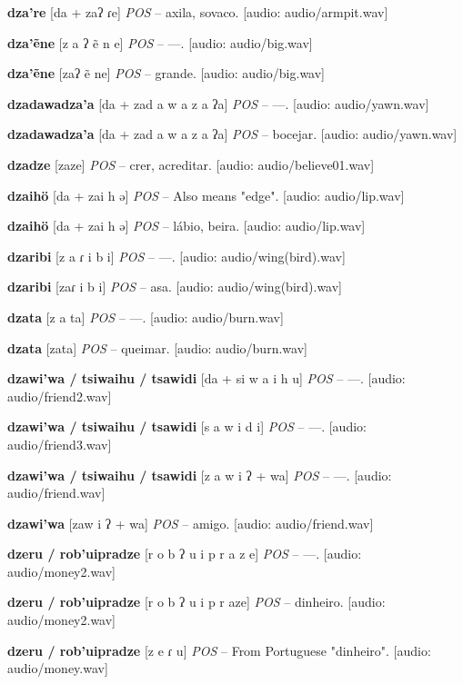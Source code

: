 \textbf{dza're} [da + zaʔ ɾe] \textit{POS} -- axila, sovaco. [audio: audio/armpit.wav]{\faHeadphones}

\textbf{dza'ẽne} [z a ʔ ẽ n e] \textit{POS} -- —. [audio: audio/big.wav]{\faHeadphones}

\textbf{dza'ẽne} [zaʔ ẽ ne] \textit{POS} -- grande. [audio: audio/big.wav]{\faHeadphones}

\textbf{dzadawadza'a} [da + zad a w a z a ʔa] \textit{POS} -- —. [audio: audio/yawn.wav]{\faHeadphones}

\textbf{dzadawadza'a} [da + zad a w a z a ʔa] \textit{POS} -- bocejar. [audio: audio/yawn.wav]{\faHeadphones}

\textbf{dzadze} [zaze] \textit{POS} -- crer, acreditar. [audio: audio/believe01.wav]{\faHeadphones}

\textbf{dzaihö} [da + zai h ə] \textit{POS} -- Also means "edge". [audio: audio/lip.wav]{\faHeadphones}

\textbf{dzaihö} [da + zai h ə] \textit{POS} -- lábio, beira. [audio: audio/lip.wav]{\faHeadphones}

\textbf{dzaribi} [z a ɾ i b i] \textit{POS} -- —. [audio: audio/wing(bird).wav]{\faHeadphones}

\textbf{dzaribi} [zaɾ i b i] \textit{POS} -- asa. [audio: audio/wing(bird).wav]{\faHeadphones}

\textbf{dzata} [z a ta] \textit{POS} -- —. [audio: audio/burn.wav]{\faHeadphones}

\textbf{dzata} [zata] \textit{POS} -- queimar. [audio: audio/burn.wav]{\faHeadphones}

\textbf{dzawi'wa / tsiwaihu / tsawidi} [da + si w a i h u] \textit{POS} -- —. [audio: audio/friend2.wav]{\faHeadphones}

\textbf{dzawi'wa / tsiwaihu / tsawidi} [s a w i d i] \textit{POS} -- —. [audio: audio/friend3.wav]{\faHeadphones}

\textbf{dzawi'wa / tsiwaihu / tsawidi} [z a w i ʔ + wa] \textit{POS} -- —. [audio: audio/friend.wav]{\faHeadphones}

\textbf{dzawi'wa} [zaw i ʔ + wa] \textit{POS} -- amigo. [audio: audio/friend.wav]{\faHeadphones}

\textbf{dzeru / rob'uipradze} [r o b ʔ u i p r a z e] \textit{POS} -- —. [audio: audio/money2.wav]{\faHeadphones}

\textbf{dzeru / rob'uipradze} [r o b ʔ u i p r aze] \textit{POS} -- dinheiro. [audio: audio/money2.wav]{\faHeadphones}

\textbf{dzeru / rob'uipradze} [z e ɾ u] \textit{POS} -- From Portuguese "dinheiro". [audio: audio/money.wav]{\faHeadphones}

